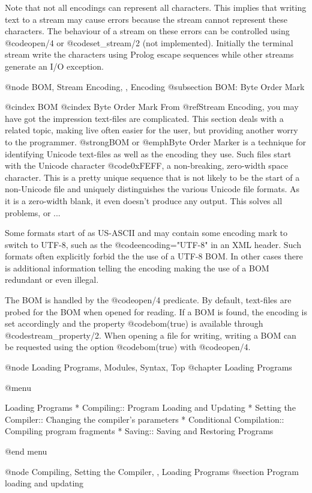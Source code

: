 {{{{Note that not all encodings can represent all characters. This implies
that writing text to a stream may cause errors because the stream
cannot represent these characters. The behaviour of a stream on these
errors can be controlled using @code{open/4} or @code{set_stream/2} (not
implemented). Initially the terminal stream write the characters using
Prolog escape sequences while other streams generate an I/O exception.


@node BOM, Stream Encoding, , Encoding
@subsection BOM: Byte Order Mark

@cindex BOM
@cindex Byte Order Mark
From @ref{Stream Encoding}, you may have got the impression text-files are
complicated. This section deals with a related topic, making live often
easier for the user, but providing another worry to the programmer.
@strong{BOM} or @emph{Byte Order Marker} is a technique for
identifying Unicode text-files as well as the encoding they use. Such
files start with the Unicode character @code{0xFEFF}, a non-breaking,
zero-width space character. This is a pretty unique sequence that is not
likely to be the start of a non-Unicode file and uniquely distinguishes
the various Unicode file formats. As it is a zero-width blank, it even
doesn't produce any output. This solves all problems, or ...

Some formats start of as US-ASCII and may contain some encoding mark to
switch to UTF-8, such as the @code{encoding="UTF-8"} in an XML header.
Such formats often explicitly forbid the the use of a UTF-8 BOM. In
other cases there is additional information telling the encoding making
the use of a BOM redundant or even illegal.

The BOM is handled by the @code{open/4} predicate. By default, text-files are
probed for the BOM when opened for reading. If a BOM is found, the
encoding is set accordingly and the property @code{bom(true)} is
available through @code{stream_property/2}. When opening a file for
writing, writing a BOM can be requested using the option
@code{bom(true)} with @code{open/4}.

@node Loading Programs, Modules, Syntax, Top
@chapter Loading Programs

@menu

Loading Programs
* Compiling:: Program Loading and Updating
* Setting the Compiler:: Changing the compiler's parameters
* Conditional Compilation:: Compiling program fragments
* Saving:: Saving and Restoring Programs

@end menu


@node Compiling, Setting the Compiler, , Loading Programs
@section Program loading and updating

}}}}
